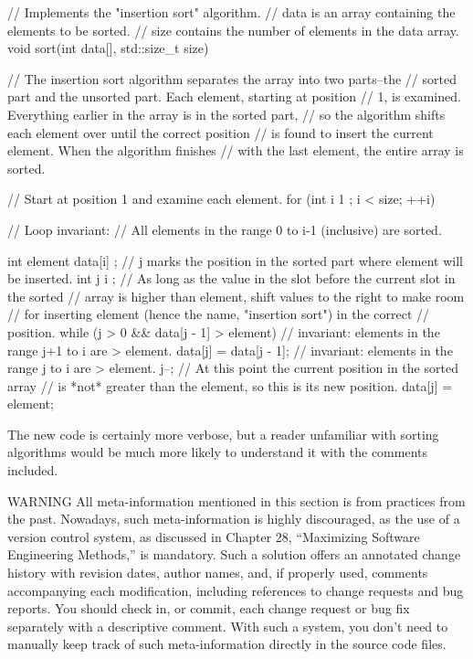 \begin{cpp}
// Implements the "insertion sort" algorithm.
// data is an array containing the elements to be sorted.
// size contains the number of elements in the data array.
void sort(int data[], std::size_t size)
{
    // The insertion sort algorithm separates the array into two parts--the
    // sorted part and the unsorted part. Each element, starting at position
    // 1, is examined. Everything earlier in the array is in the sorted part,
    // so the algorithm shifts each element over until the correct position
    // is found to insert the current element. When the algorithm finishes
    // with the last element, the entire array is sorted.

    // Start at position 1 and examine each element.
    for (int i { 1 }; i < size; ++i) {
        // Loop invariant:
        //   All elements in the range 0 to i-1 (inclusive) are sorted.

        int element { data[i] };
        // j marks the position in the sorted part where element will be inserted.
        int j { i };
        // As long as the value in the slot before the current slot in the sorted
        // array is higher than element, shift values to the right to make room
        // for inserting element (hence the name, "insertion sort") in the correct
        // position.
        while (j > 0 && data[j - 1] > element) {
            // invariant: elements in the range j+1 to i are > element.
            data[j] = data[j - 1];
            // invariant: elements in the range j to i are > element.
            j--;
        }
        // At this point the current position in the sorted array
        // is *not* greater than the element, so this is its new position.
        data[j] = element;
    }
}
\end{cpp}

The new code is certainly more verbose, but a reader unfamiliar with sorting algorithms would be much more likely to understand it with the comments included.


\begin{myWarning}{WARNING}
All meta-information mentioned in this section is from practices from the past. Nowadays, such meta-information is highly discouraged, as the use of a version control system, as discussed in Chapter 28, “Maximizing Software Engineering Methods,” is mandatory. Such a solution offers an annotated change history with revision dates, author names, and, if properly used, comments accompanying each modification, including references to change requests and bug reports. You should check in, or commit, each change request or bug fix separately with a descriptive comment. With such a system, you don’t need to manually keep track of such meta-information directly in the source code files.
\end{myWarning}

